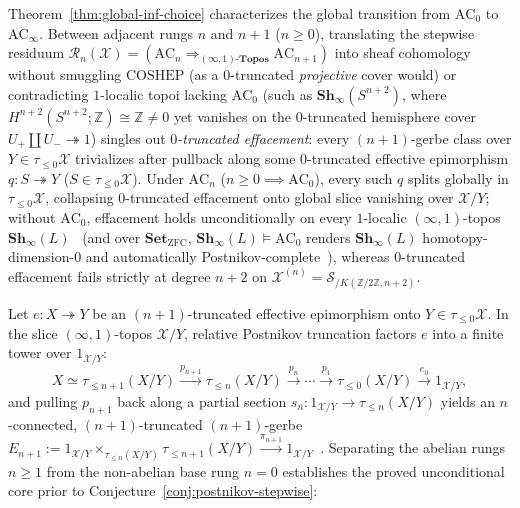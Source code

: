 Theorem~\ref{thm:global-inf-choice} characterizes the global transition from $\mathrm{AC}_0$ to $\mathrm{AC}_\infty$. Between adjacent rungs $n$ and $n+1$ ($n \ge 0$), translating the stepwise residuum $\mathcal{R}_n(\mathcal{X}) = (\mathrm{AC}_n \Rightarrow_{(\infty,1)\text{-}\mathbf{Topos}} \mathrm{AC}_{n+1})$ into sheaf cohomology without smuggling $\mathrm{COSHEP}$ (as a $0$-truncated \emph{projective} cover would) or contradicting $1$-localic topoi lacking $\mathrm{AC}_0$ (such as $\mathbf{Sh}_\infty(S^{n+2})$, where $H^{n+2}(S^{n+2}; \mathbb{Z}) \cong \mathbb{Z} \neq 0$ yet vanishes on the $0$-truncated hemisphere cover $U_+ \amalg U_- \twoheadrightarrow 1$) singles out \emph{$0$-truncated effacement}: every $(n+1)$-gerbe class over $Y \in \tau_{\le 0}\mathcal{X}$ trivializes after pullback along some $0$-truncated effective epimorphism $q : S \twoheadrightarrow Y$ ($S \in \tau_{\le 0}\mathcal{X}$). Under $\mathrm{AC}_n$ ($n \ge 0 \implies \mathrm{AC}_0$), every such $q$ splits globally in $\tau_{\le 0}\mathcal{X}$, collapsing $0$-truncated effacement onto global slice vanishing over $\mathcal{X}/Y$; without $\mathrm{AC}_0$, effacement holds unconditionally on every $1$-localic $(\infty, 1)$-topos $\mathbf{Sh}_\infty(L)$~\cite[\S6.4.5]{Lurie09} (and over $\mathbf{Set}_{\mathrm{ZFC}}$, $\mathbf{Sh}_\infty(L) \models \mathrm{AC}_0$ renders $\mathbf{Sh}_\infty(L)$ homotopy-dimension-$0$ and automatically Postnikov-complete~\cite[Corollary~7.2.1.12]{Lurie09}), whereas $0$-truncated effacement fails strictly at degree $n+2$ on $\mathcal{X}^{(n)} = \mathcal{S}_{/K(\mathbb{Z}/2\mathbb{Z}, n+2)}$.

Let $e: X \twoheadrightarrow Y$ be an $(n+1)$-truncated effective epimorphism onto $Y \in \tau_{\le 0}\mathcal{X}$. In the slice $(\infty, 1)$-topos $\mathcal{X}/Y$, relative Postnikov truncation factors $e$ into a finite tower over $1_{\mathcal{X}/Y}$:
\[
  X \simeq \tau_{\le n+1}(X/Y) \xrightarrow{p_{n+1}} \tau_{\le n}(X/Y) \xrightarrow{p_n} \cdots \xrightarrow{p_1} \tau_{\le 0}(X/Y) \xrightarrow{e_0} 1_{\mathcal{X}/Y},
\]
and pulling $p_{n+1}$ back along a partial section $s_n : 1_{\mathcal{X}/Y} \to \tau_{\le n}(X/Y)$ yields an $n$-connected, $(n+1)$-truncated $(n+1)$-gerbe $E_{n+1} := 1_{\mathcal{X}/Y} \times_{\tau_{\le n}(X/Y)} \tau_{\le n+1}(X/Y) \xrightarrow{\pi_{n+1}} 1_{\mathcal{X}/Y}$~\cite[Def.~7.2.2.20]{Lurie09}. Separating the abelian rungs $n \ge 1$ from the non-abelian base rung $n = 0$ establishes the proved unconditional core prior to Conjecture~\ref{conj:postnikov-stepwise}:

